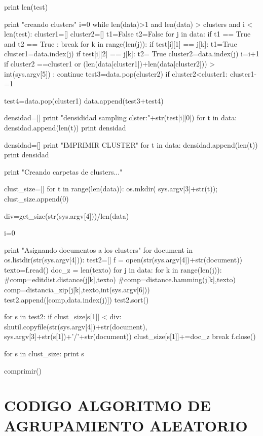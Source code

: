 \begin{python}
	print len(test)	
		
		
	print "creando clusters"
	i=0
	while len(data)>1 and len(data) > clusters and i < len(test):
		cluster1=[]
		cluster2=[]
		t1=False
		t2=False
		for j in data:
			if t1 == True and t2 == True :
				break
			for k in range(len(j)):
				if test[i][1] == j[k]:
					t1=True
					cluster1=data.index(j)
				if test[i][2] == j[k]:
					t2= True
					cluster2=data.index(j)
		i=i+1
		if cluster2 ==cluster1 or (len(data[cluster1])+len(data[cluster2])) > int(sys.argv[5]) : 
			continue
		test3=data.pop(cluster2)		
		if cluster2<cluster1:
			cluster1-=1
				
		test4=data.pop(cluster1)
		data.append(test3+test4)
		
		densidad=[]		
		print "densididad sampling clster:"+str(test[i][0])
		for t in data:
			densidad.append(len(t))
		print densidad
		
	densidad=[]		
	print "IMPRIMIR CLUSTER"
	for t in data:
		densidad.append(len(t))
	print densidad
	
	print "Creando carpetas de clusters..."
	
	clust_size=[]
	for t in range(len(data)):
		os.mkdir( sys.argv[3]+str(t));
		clust_size.append(0)

	div=get_size(str(sys.argv[4]))/len(data)
		
	i=0
	
	print "Asignando documentos a los clusters"
	for document in os.listdir(str(sys.argv[4])):		
		test2=[]
		f = open(str(sys.argv[4])+str(document))		
		texto=f.read()
		doc_z = len(texto)
		for j in data:
			for k in range(len(j)):
				#comp=editdist.distance(j[k],texto)
				#comp=distance.hamming(j[k],texto)	
				comp=distancia_zip(j[k],texto,int(sys.argv[6]))	
				test2.append([comp,data.index(j)])	          
		test2.sort()
		
		for s in test2:
			if clust_size[s[1]] < div:
				shutil.copyfile(str(sys.argv[4])+str(document), sys.argv[3]+str(s[1])+'/'+str(document))
				clust_size[s[1]]+=doc_z
				break
		f.close()
	
	for s in clust_size:
		print s
	
	comprimir()	
	
	

\end{python}


\chapter{CODIGO ALGORITMO DE AGRUPAMIENTO ALEATORIO}
\label{ch:Codigo Metodo de agrupación random}

